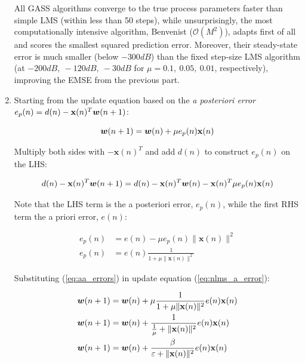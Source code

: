 \begin{enumerate}[label=\alph*), leftmargin=*]
All GASS algorithms converge to the true process parameters faster than simple LMS (within less than 50 steps), while unsurprisingly,
the most computationally intensive algorithm, Benvenist ($\mathcal{O}(M^{2})$), adapts first of all and scores the smallest squared prediction error.
Moreover, their steady-state error is much smaller (below $-300dB$) than the fixed step-size LMS algorithm (at $-200dB,\ -120dB,\ -30dB$ for $\mu = 0.1,\ 0.05,\ 0.01$, respectively),
improving the EMSE from the previous part.

\item
%

Starting from the update equation based on the \textit{a posteriori error} $e_{p}(n) = d(n) - \mathbf{x}(n)^{T} {\bm{w}}(n + 1)$:

\begin{equation}
    {\bm{w}}(n + 1) = {\bm{w}}(n) + \mu e_{p}(n) \mathbf{x}(n)
\label{eq:nlms_a_error}
\end{equation}

Multiply both sides with $-\mathbf{x}(n)^{T}$ and add $d(n)$ to construct $e_{p}(n)$ on the LHS:

\begin{equation}
    d(n) - \mathbf{x}(n)^{T} {\bm{w}}(n + 1) = d(n) - \mathbf{x}(n)^{T} {\bm{w}}(n) - \mathbf{x}(n)^{T} \mu e_{p}(n) \mathbf{x}(n)
\end{equation}

Note that the LHS term is the a posteriori error, $e_{p}(n)$, while the first RHS term the a priori error, $e(n)$:

\begin{align}
    e_{p}(n)    &= e(n) - \mu e_{p}(n) \| \mathbf{x}(n) \|^{2} \\
    e_{p}(n)    &= e(n) \frac{1}{1 + \mu \| \mathbf{x}(n) \|^{2}}
\label{eq:aa_errors}
\end{align}

Substituting (\ref{eq:aa_errors}) in update equation (\ref{eq:nlms_a_error}):

\begin{align}
    {\bm{w}}(n + 1)  &= {\bm{w}}(n) + \mu \frac{1}{1 + \mu \| \mathbf{x}(n) \|^{2}} e(n) \mathbf{x}(n) \\
    {\bm{w}}(n + 1)  &= {\bm{w}}(n) + \frac{1}{\frac{1}{\mu} + \| \mathbf{x}(n) \|^{2}} e(n) \mathbf{x}(n) \\
    {\bm{w}}(n + 1)  &= {\bm{w}}(n) + \frac{\beta}{\varepsilon + \| \mathbf{x}(n) \|^{2}} e(n) \mathbf{x}(n) \label{eq:nlms}
\end{align}


\end{enumerate}
